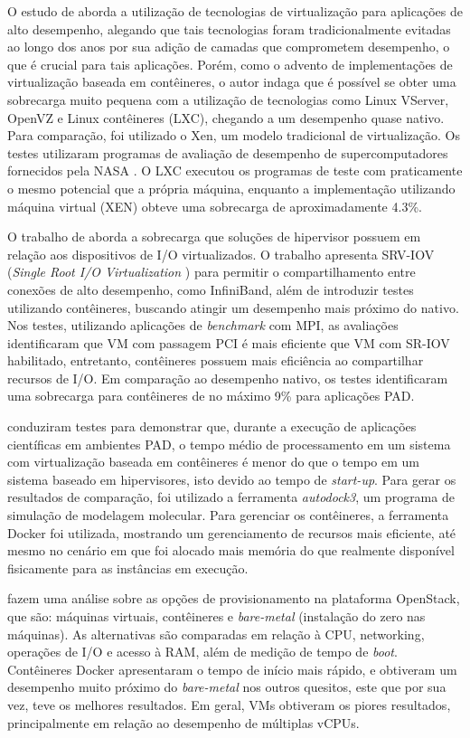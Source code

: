 \documentclass[twoside,english,brazilian]{UNISINOSartigo}
\begin{document}
O estudo de  aborda a utilização de tecnologias de virtualização para aplicações de alto desempenho, alegando que tais tecnologias foram tradicionalmente evitadas ao longo dos anos por sua adição de camadas que comprometem desempenho, o que é crucial para tais aplicações. Porém, como o advento de implementações de virtualização baseada em contêineres, o autor indaga que é possível se obter uma sobrecarga muito pequena com a utilização de tecnologias como Linux VServer, OpenVZ e Linux contêineres (LXC), chegando a um desempenho quase nativo. Para comparação, foi utilizado o Xen, um modelo tradicional de virtualização. Os testes utilizaram programas de avaliação de desempenho de supercomputadores fornecidos pela NASA \cite{NASA2016}. O LXC executou os programas de teste com praticamente o mesmo potencial que a própria máquina, enquanto a implementação utilizando máquina virtual (XEN) obteve uma sobrecarga de aproximadamente 4.3\%.

O trabalho de  aborda a sobrecarga que soluções de hipervisor possuem em relação aos dispositivos de I/O virtualizados. O trabalho apresenta SRV-IOV (\textit{Single Root I/O Virtualization }) para permitir o compartilhamento entre conexões de alto desempenho, como InfiniBand, além de introduzir testes utilizando contêineres, buscando atingir um desempenho mais próximo do nativo. Nos testes, utilizando aplicações de \textit{benchmark} com MPI, as avaliações identificaram que VM com passagem PCI é mais eficiente que VM com SR-IOV habilitado, entretanto, contêineres possuem mais eficiência ao compartilhar recursos de I/O. Em comparação ao desempenho nativo, os testes identificaram uma sobrecarga para contêineres de no máximo 9\% para aplicações PAD.

 conduziram testes para demonstrar que, durante a execução de aplicações científicas em ambientes PAD, o tempo médio de processamento em um sistema com virtualização baseada em contêineres é menor do que o tempo em um sistema baseado em hipervisores, isto devido ao tempo de \textit{start-up}. Para gerar os resultados de comparação, foi utilizado a ferramenta \textit{autodock3}, um programa de simulação de modelagem molecular. Para gerenciar os contêineres, a ferramenta Docker foi utilizada, mostrando um gerenciamento de recursos mais eficiente, até mesmo no cenário em que foi alocado mais memória do que realmente disponível fisicamente para as instâncias em execução. 

 fazem uma análise sobre as opções de provisionamento na plataforma OpenStack, que são: máquinas virtuais, contêineres e \textit{bare-metal} (instalação do zero nas máquinas). As alternativas são comparadas em relação à CPU, networking, operações de I/O e acesso à RAM, além de medição de tempo de \textit{boot}. Contêineres Docker apresentaram o tempo de início mais rápido, e obtiveram um desempenho muito próximo do \textit{bare-metal} nos outros quesitos, este que por sua vez, teve os melhores resultados. Em geral, VMs obtiveram os piores resultados, principalmente em relação ao desempenho de múltiplas vCPUs.
\end{document}
